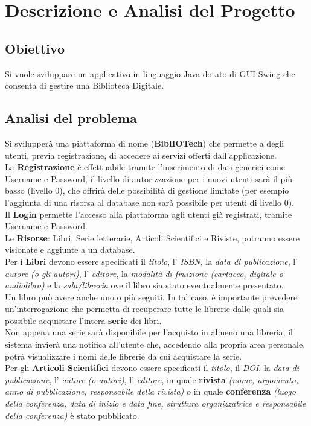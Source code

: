 \chapter{Descrizione e Analisi del Progetto}
\section{Obiettivo}
Si vuole sviluppare un applicativo in linguaggio Java dotato di GUI Swing che 
consenta di gestire una Biblioteca Digitale.
\section{Analisi del problema}
Si svilupper\`a una piattaforma di nome (\textbf{BiblIOTech}) che permette a degli utenti,
previa registrazione, di accedere ai servizi offerti dall'applicazione.
\\ \indent La \textbf{Registrazione} \`e effettuabile tramite l'inserimento di dati
generici come Username e Password, il livello di autorizzazione per i nuovi utenti sar\`a
il pi\`u basso (livello 0), che offrir\`a delle possibilit\`a di gestione limitate 
(per esempio l'aggiunta di una risorsa al database non sar\`a possibile per utenti di livello 0).
\\ \indent Il \textbf{Login} permette l'accesso alla piattaforma agli utenti gi\`a registrati,
 tramite Username e Password.
\\ \indent Le \textbf{Risorse}: Libri, Serie letterarie, Articoli Scientifici e Riviste, 
potranno essere visionate e aggiunte a un database.
\\ \indent Per i \textbf{Libri} devono essere specificati il \emph{titolo}, l' \emph{ISBN}, la
\emph{data di publicazione}, l' \emph{autore (o gli autori)}, l' \emph{editore}, la 
\emph{modalit\`a di fruizione (cartaceo, digitale o audiolibro)} e la \emph{sala/libreria} 
ove il libro sia stato eventualmente presentato.\\ 

Un libro pu\`o avere anche uno o pi\`u seguiti. In tal caso, \`e 
importante prevedere un'interrogazione che permetta di recuperare tutte le librerie dalle quali
sia possibile acquistare l'intera \textbf{serie} dei libri.
\\
Non appena una serie sar\`a disponibile per l'acquisto in almeno una libreria, il sistema 
invier\`a una notifica all'utente che, accedendo alla propria area personale, potr\`a visualizzare
i nomi delle librerie da cui acquistare la serie.
\\ \indent Per gli \textbf{Articoli Scientifici} devono essere specificati il \emph{titolo}, 
il \emph{DOI}, la \emph{data di publicazione}, l' \emph{autore (o autori)}, l' \emph{editore}, 
in quale \textbf{rivista} \emph{(nome, argomento, anno di pubblicazione, responsabile della 
rivista)} o in quale \textbf{conferenza} \emph{(luogo della conferenza, data di inizio e data 
fine, struttura organizzatrice e responsabile della conferenza)} \`e stato pubblicato.
